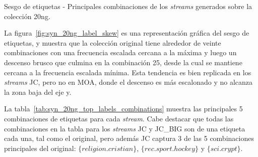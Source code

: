 \begin{table}[htbp]
	\centering
	\begin{adjustbox}{max width=\textwidth}
		
	\end{adjustbox}
	\caption{Sesgo de etiquetas - Principales combinaciones de los
		\textit{streams} generados sobre la colección 20ng.}
	\label{tab:syn_20ng_top_labels_combinations}
\end{table}

La figura~\ref{fig:syn_20ng_label_skew} es una representación gráfica del sesgo
de etiquetas, y muestra que la colección original tiene alrededor de veinte
combinaciones con una frecuencia escalada cercana a la máxima y luego un
descenso brusco que culmina en la combinación 25, desde la cual se mantiene
cercana a la frecuencia escalada mínima. Esta tendencia es bien replicada en los
\textit{streams} JC, pero no en MOA, donde el descenso es más escalonado y no
alcanza la zona baja del eje y.

La tabla~\ref{tab:syn_20ng_top_labels_combinations} muestra las principales 5
combinaciones de etiquetas para cada \textit{stream}. Cabe destacar que todas
las combinaciones en la tabla para los \textit{streams} JC y JC\_BIG son de una
etiqueta cada una, tal como el original, pero además JC captura 3 de las 5
combinaciones principales del original: $\{religion.cristian\}$,
$\{rec.sport.hockey\}$ y $\{sci.crypt\}$.

